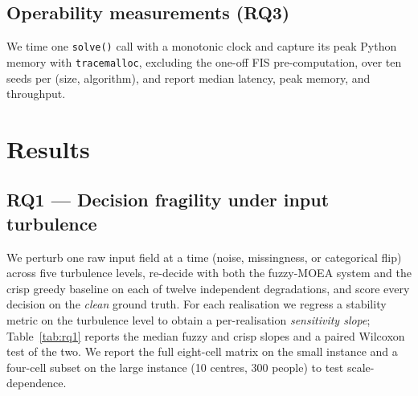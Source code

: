 \documentclass[systems,article,submit,moreauthors,pdftex]{Definitions/mdpi}
\begin{document}
\subsection{Operability measurements (RQ3)}\label{sec:method-operability}
We time one \texttt{solve()} call with a monotonic clock and capture its peak Python memory
with \texttt{tracemalloc}, excluding the one-off FIS pre-computation, over ten seeds per
(size, algorithm), and report median latency, peak memory, and throughput.

\section{Results}\label{sec:results}

\subsection{RQ1 --- Decision fragility under input turbulence}\label{sec:rq1}

We perturb one raw input field at a time (noise, missingness, or categorical
flip) across five turbulence levels, re-decide with both the fuzzy-MOEA system and
the crisp greedy baseline on each of twelve independent degradations, and score every
decision on the \emph{clean} ground truth. For each realisation we regress a stability
metric on the turbulence level to obtain a per-realisation \emph{sensitivity slope};
Table~\ref{tab:rq1}
reports the median fuzzy and crisp slopes and a paired Wilcoxon test of the two.
We report the full eight-cell matrix on the small instance and a four-cell subset on the
large instance (10 centres, 300 people) to test scale-dependence.
\end{document}
